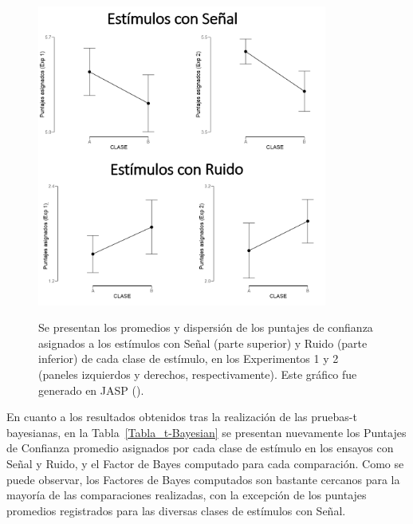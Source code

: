 \begin{figure}[th]
\centering
\includegraphics[width=0.85\textwidth]{Figures/JASP_MeanRatings}\\ 
\caption[Gráfico de dispersión para los puntajes de confianza asignados a cada clase de estímulo]{Se presentan los promedios y dispersión de los puntajes de confianza asignados a los estímulos con Señal (parte superior) y Ruido (parte inferior) de cada clase de estímulo, en los Experimentos 1 y 2 (paneles izquierdos y derechos, respectivamente). Este gráfico fue generado en JASP (\citeyear{JASP}).}
\label{fig:JASP_MeanRatings}
\end{figure}

En cuanto a los resultados obtenidos tras la realización de las pruebas-t bayesianas, en la Tabla~\ref{Tabla_t-Bayesian} se presentan nuevamente los Puntajes de Confianza promedio asignados por cada clase de estímulo en los ensayos con Señal y Ruido, y el Factor de Bayes computado para cada comparación. Como se puede observar, los Factores de Bayes computados son bastante cercanos para la mayoría de las comparaciones realizadas, con la excepción de los puntajes promedios registrados para las diversas clases de estímulos con Señal.\\


